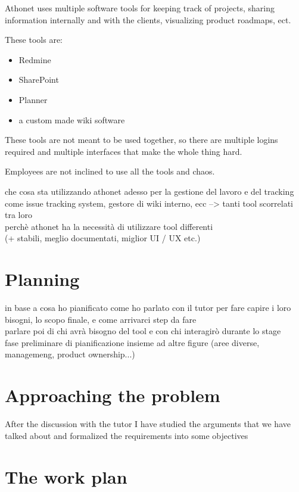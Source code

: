 	Athonet uses multiple software tools for keeping track of projects, sharing information internally and with the clients, visualizing product roadmaps, ect.

	These tools are:
	\begin{itemize}
		\item Redmine
		\item SharePoint
		\item Planner
		\item a custom made wiki software
	\end{itemize}

	These tools are not meant to be used together, so there are multiple logins required and multiple interfaces that make the whole thing hard.
	
	Employees are not inclined to use all the tools and chaos.

che cosa sta utilizzando athonet adesso per la gestione del lavoro e del tracking\\
come issue tracking system, gestore di wiki interno, ecc --> tanti tool scorrelati tra loro\\
perchè athonet ha la necessità di utilizzare tool differenti \\
(+ stabili, meglio documentati, miglior UI / UX etc.)

\section{Planning}
in base a cosa ho pianificato
come ho parlato con il tutor per fare capire i loro bisogni, lo scopo finale, e come arrivarci
step da fare\\
parlare poi di chi avrà bisogno del tool e con chi interagirò durante lo stage\\
fase preliminare di pianificazione insieme ad altre figure (aree diverse, managemeng, product ownership...)

\section{Approaching the problem}

	After the discussion with the tutor I have studied the arguments that we have talked about and formalized the requirements into some objectives

\section{The work plan}

